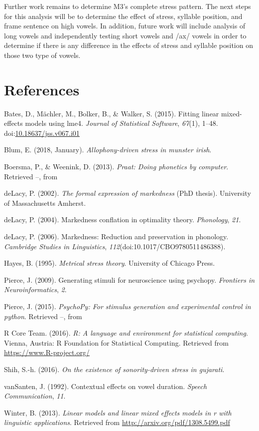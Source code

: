 \documentclass[floatsintext,man]{apa6}
\theoremstyle{definition}
\theoremstyle{definition}
\theoremstyle{definition}
\theoremstyle{remark}
\begin{document}
Further work remains to determine M3's complete stress pattern. The next
steps for this analysis will be to determine the effect of stress,
syllable position, and frame sentence on high vowels. In addition,
future work will include analysis of long vowels and independently
testing short vowels and /ax/ vowels in order to determine if there is
any difference in the effects of stress and syllable position on those
two type of vowels.

\newpage

\section{References}\label{references}

\setlength{\parindent}{-0.5in} \setlength{\leftskip}{0.5in}

\hypertarget{refs}{}
\hypertarget{ref-R-lme4}{}
Bates, D., Mächler, M., Bolker, B., \& Walker, S. (2015). Fitting linear
mixed-effects models using lme4. \emph{Journal of Statistical Software},
\emph{67}(1), 1--48.
doi:\href{https://doi.org/10.18637/jss.v067.i01}{10.18637/jss.v067.i01}

\hypertarget{ref-blum2018}{}
Blum, E. (2018, January). \emph{Allophony-driven stress in munster
irish}.

\hypertarget{ref-praat}{}
Boersma, P., \& Weenink, D. (2013). \emph{Praat: Doing phonetics by
computer}. Retrieved --, from

\hypertarget{ref-delacy2002}{}
deLacy, P. (2002). \emph{The formal expression of markedness}
(PhD thesis). University of Massachusetts Amherst.

\hypertarget{ref-delacy2004}{}
deLacy, P. (2004). Markedness conflation in optimality theory.
\emph{Phonology}, \emph{21}.

\hypertarget{ref-delacy2006}{}
deLacy, P. (2006). Markedness: Reduction and preservation in phonology.
\emph{Cambridge Studies in Linguistics},
\emph{112}(doi:10.1017/CBO9780511486388).

\hypertarget{ref-hayes95}{}
Hayes, B. (1995). \emph{Metrical stress theory}. University of Chicago
Press.

\hypertarget{ref-psychopy2}{}
Pierce, J. (2009). Generating stimuli for neuroscience using psychopy.
\emph{Frontiers in Neuroinformatics}, \emph{2}.

\hypertarget{ref-psychopy}{}
Pierce, J. (2015). \emph{PsychoPy: For stimulus generation and
experimental control in python}. Retrieved --, from

\hypertarget{ref-R-base}{}
R Core Team. (2016). \emph{R: A language and environment for statistical
computing}. Vienna, Austria: R Foundation for Statistical Computing.
Retrieved from \url{https://www.R-project.org/}

\hypertarget{ref-shih2016}{}
Shih, S.-h. (2016). \emph{On the existence of sonority-driven stress in
gujarati}.

\hypertarget{ref-vanSanten92}{}
vanSanten, J. (1992). Contextual effects on vowel duration. \emph{Speech
Communication}, \emph{11}.

\hypertarget{ref-Winter-lmer}{}
Winter, B. (2013). \emph{Linear models and linear mixed effects models
in r with linguistic applications}. Retrieved from
\url{http://arxiv.org/pdf/1308.5499.pdf}
\end{document}
